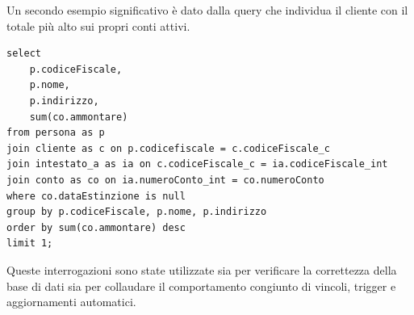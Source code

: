 Un secondo esempio significativo è dato dalla query che individua il cliente con il totale più alto sui propri conti attivi.

\begin{lstlisting}[caption={Cliente con ammontare complessivo più elevato}]
select
    p.codiceFiscale,
    p.nome,
    p.indirizzo,
    sum(co.ammontare)
from persona as p
join cliente as c on p.codicefiscale = c.codiceFiscale_c
join intestato_a as ia on c.codiceFiscale_c = ia.codiceFiscale_int
join conto as co on ia.numeroConto_int = co.numeroConto
where co.dataEstinzione is null
group by p.codiceFiscale, p.nome, p.indirizzo
order by sum(co.ammontare) desc
limit 1;
\end{lstlisting}

Queste interrogazioni sono state utilizzate sia per verificare la correttezza della base di dati sia per collaudare il comportamento congiunto di vincoli, trigger e aggiornamenti automatici.
